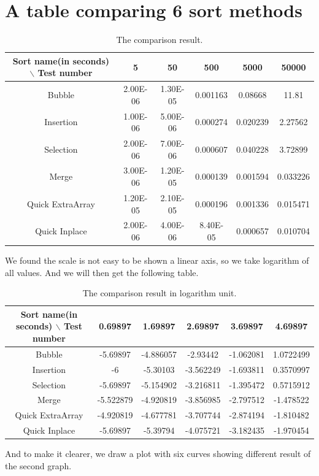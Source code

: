 \documentclass{article}
\begin{document}
\section{A table comparing 6 sort methods}
\begin{table}[!htbp]
  \centering
    \begin{tabular}{|c|ccccc|} \hline
   Sort name(in seconds) $\backslash$  Test number & 5     & 50    & 500   & 5000  & 50000 \\ \hline
    Bubble & 2.00E-06 & 1.30E-05 & 0.001163 & 0.08668 & 11.81 \\  
    Insertion & 1.00E-06 & 5.00E-06 & 0.000274 & 0.020239 & 2.27562 \\  
    Selection & 2.00E-06 & 7.00E-06 & 0.000607 & 0.040228 & 3.72899 \\ 
    Merge & 3.00E-06 & 1.20E-05 & 0.000139 & 0.001594 & 0.033226 \\  
    Quick ExtraArray & 1.20E-05 & 2.10E-05 & 0.000196 & 0.001336 & 0.015471 \\
    Quick Inplace & 2.00E-06 & 4.00E-06 & 8.40E-05 & 0.000657 & 0.010704 \\ \hline
    \end{tabular}%
    \caption{The comparison result.}
\end{table}%
We found the scale is not easy to be shown a linear axis, so we take logarithm of all values. And we will then get the following table.
\begin{table}[!htbp]
  \centering
    \begin{tabular}{|c|ccccc|} \hline
   Sort name(in seconds) $\backslash$  Test number & 0.69897 & 1.69897 & 2.69897 & 3.69897 & 4.69897 \\ \hline
    Bubble & -5.69897 & -4.886057 & -2.93442 & -1.062081 & 1.0722499 \\
    Insertion & -6    & -5.30103 & -3.562249 & -1.693811 & 0.3570997 \\
    Selection & -5.69897 & -5.154902 & -3.216811 & -1.395472 & 0.5715912 \\
    Merge & -5.522879 & -4.920819 & -3.856985 & -2.797512 & -1.478522 \\
    Quick ExtraArray & -4.920819 & -4.677781 & -3.707744 & -2.874194 & -1.810482 \\
    Quick Inplace & -5.69897 & -5.39794 & -4.075721 & -3.182435 & -1.970454 \\ \hline 
        \end{tabular}%
    \caption{The comparison result in logarithm unit.}
\end{table}%
\begin{flushleft}
And to make it clearer, we draw a plot with six curves showing different result of the second graph.
\end{flushleft}
\end{document}
